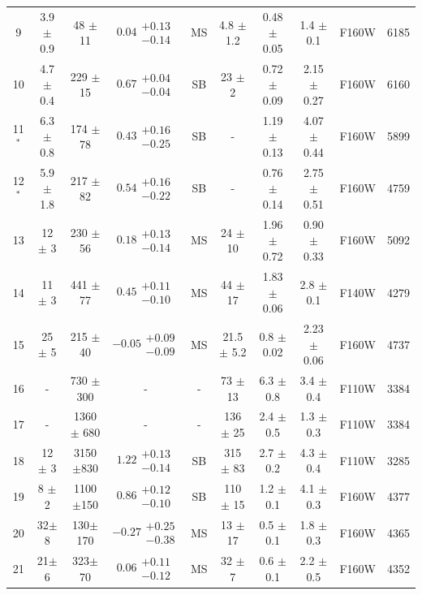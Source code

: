 \begin{table}[htbp!]
\begin{center}
\begin{tabular}{cccccccccc}
9 & 3.9 $\pm$ 0.9 & 48 $\pm$ 11 & $0.04 \substack{+ 0.13 \\- 0.14 }$ & MS & 4.8 $\pm$ 1.2 & 0.48 $\pm$ 0.05 & 1.4 $\pm$ 0.1 & F160W & 6185\\
10 & 4.7 $\pm$ 0.4 & 229 $\pm$ 15 & $0.67 \substack{+ 0.04 \\- 0.04 }$ & SB & 23 $\pm$ 2 & 0.72 $\pm$ 0.09 & 2.15 $\pm$ 0.27 & F160W & 6160\\
11$^{*}$ & 6.3 $\pm$ 0.8 & 174 $\pm$ 78 & $0.43 \substack{+ 0.16 \\- 0.25 }$ & SB & - & 1.19 $\pm$ 0.13 & 4.07 $\pm$ 0.44 & F160W & 5899\\%
12$^{*}$ & 5.9 $\pm$ 1.8 & 217 $\pm$ 82 & $ 0.54 \substack{+ 0.16 \\- 0.22 }$ & SB & - & 0.76 $\pm$ 0.14 & 2.75 $\pm$ 0.51 & F160W & 4759\\
13 & 12 $\pm$ 3 & 230 $\pm$ 56  & $ 0.18 \substack{+ 0.13 \\- 0.14 }$ & MS & 24 $\pm$ 10 & 1.96 $\pm$ 0.72 & 0.90 $\pm$ 0.33 & F160W & 5092\\
14 & 11 $\pm$ 3 & 441 $\pm$ 77 & $ 0.45 \substack{+ 0.11 \\- 0.10 }$ & MS & 44 $\pm$ 17 & 1.83 $\pm$ 0.06 & 2.8 $\pm$ 0.1 & F140W & 4279\\
15 & 25 $\pm$ 5 & 215 $\pm$ 40 & $ -0.05 \substack{+ 0.09 \\- 0.09 }$ & MS & 21.5 $\pm$ 5.2 & 0.8 $\pm$ 0.02 & 2.23 $\pm$ 0.06 & F160W & 4737\\
16 & - & 730 $\pm$ 300 & - & - & 73 $\pm$ 13 & 6.3 $\pm$ 0.8 & 3.4 $\pm$ 0.4 & F110W & 3384\\
17 & - & 1360 $\pm$ 680 & - & - & 136 $\pm$ 25 &  2.4 $\pm$ 0.5 & 1.3 $\pm$ 0.3 & F110W & 3384\\
18 & 12 $\pm$ 3 & 3150$\pm$830  & $ 1.22 \substack{+ 0.13 \\- 0.14 }$ & SB & 315 $\pm$ 83 & 2.7 $\pm$ 0.2 &  4.3 $\pm$ 0.4 & F110W & 3285\\
19 & 8 $\pm$ 2 & 1100$\pm$150 & $ 0.86 \substack{+ 0.12 \\- 0.10 }$ & SB & 110 $\pm$ 15 & 1.2 $\pm$ 0.1 & 4.1 $\pm$ 0.3 & F160W & 4377\\ 
20 & 32$\pm$8 & 130$\pm$170 &  $ -0.27 \substack{+ 0.25 \\- 0.38 }$ & MS & 13 $\pm$ 17 & 0.5 $\pm$ 0.1 & 1.8 $\pm$ 0.3 & F160W  & 4365\\ 
21 & 21$\pm$6 & 323$\pm$70  & $ 0.06 \substack{+ 0.11 \\- 0.12 }$ & MS & 32 $\pm$ 7 & 0.6 $\pm$ 0.1 & 2.2 $\pm$ 0.5 & F160W & 4352\\ 

\end{tabular}
\end{center}
\end{table}
